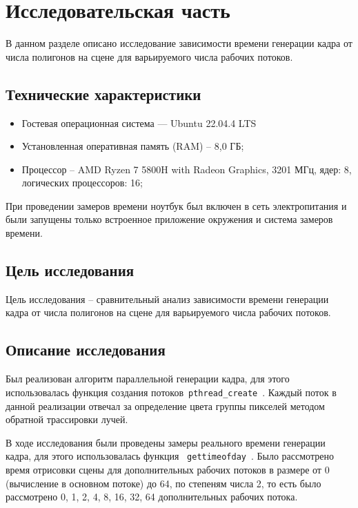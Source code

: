 \chapter{Исследовательская часть}

В данном разделе описано исследование зависимости времени генерации кадра от числа полигонов на сцене для варьируемого числа рабочих потоков.

\section{Технические характеристики}
\begin{itemize}
	\item {Гостевая операционная система --- Ubuntu 22.04.4 LTS}
	\item {Установленная оперативная память (RAM) -- 8,0 ГБ;}
	\item {Процессор -- AMD Ryzen 7 5800H with Radeon Graphics, 3201 МГц, ядер: 8, логических процессоров: 16;}
\end{itemize}

При проведении замеров времени ноутбук был включен в сеть электропитания и были запущены только встроенное приложение окружения и система замеров времени.

\section{Цель исследования}
Цель исследования -- сравнительный анализ зависимости времени генерации кадра от числа полигонов на сцене для варьируемого числа рабочих потоков.

\section{Описание исследования}

Был реализован алгоритм параллельной генерации кадра, для этого использовалась функция создания потоков~\texttt{pthread\_create}~\cite{thread-city}. Каждый поток в данной реализации отвечал за определение цвета группы пикселей методом обратной трассировки лучей. 

В ходе исследования были проведены замеры реального времени генерации кадра, для этого использовалась функция ~\texttt{gettimeofday}~\cite{time-city}. Было рассмотрено время отрисовки сцены для дополнительных рабочих потоков в размере от 0 (вычисление в основном потоке) до 64, по степеням числа 2, то есть было рассмотрено 0, 1, 2, 4, 8, 16, 32, 64 дополнительных рабочих потока.

